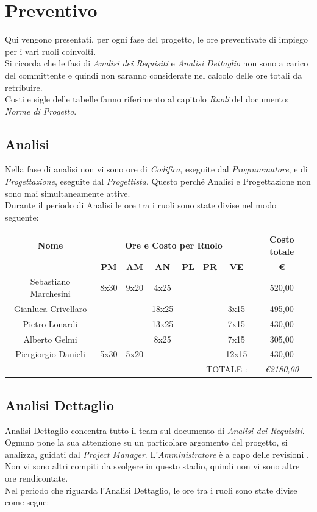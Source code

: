 \documentclass[12pt,a4paper,titlepage]{article}
\begin{document}
\newpage

\section{Preventivo}
Qui vengono presentati, per ogni fase del progetto, le ore preventivate di impiego per i vari ruoli coinvolti.\\
Si ricorda che le fasi di \textit{Analisi dei Requisiti} e \textit{Analisi Dettaglio} non sono a carico del committente e quindi non saranno considerate nel calcolo delle ore totali da retribuire. \\
Costi e sigle delle tabelle fanno riferimento al capitolo \textit{Ruoli} del documento: \textit{Norme di Progetto}.

\subsection{Analisi}
Nella fase di analisi non vi sono ore di \textit{Codifica}, eseguite dal \textit{Programmatore}, e di \textit{Progettazione}, eseguite dal \textit{Progettista}. Questo perché Analisi e Progettazione non sono mai simultaneamente attive. \\
Durante il periodo di Analisi le ore tra i ruoli sono state divise nel modo seguente: \\

{\renewcommand\arraystretch{1.2} %
\begin{tabular}{|c|c|c|c|c|c|c|c|}
	\hline 
	\textbf{Nome} & \multicolumn{6}{c|}{\textbf{Ore e Costo per Ruolo}} & \textbf{Costo totale} \\ 
	& \textbf{PM} & \textbf{AM} & \textbf{AN} & \textbf{PL} & \textbf{PR} & \textbf{VE} & \textbf{ \euro } \\ 
	\hline
	Sebastiano Marchesini & 8x30 & 9x20 & 4x25 & & & & 520,00 \\ 
	\hline 
	Gianluca Crivellaro & & & 18x25 & & & 3x15 & 495,00 \\ 
	\hline 
	Pietro Lonardi & & & 13x25 & & & 7x15 & 430,00 \\ 
	\hline 
	Alberto Gelmi & & & 8x25 & & & 7x15 & 305,00 \\ 
	\hline 
	Piergiorgio Danieli & 5x30 & 5x20 & & & & 12x15 & 430,00 \\ 
	\hline 
	\multicolumn{7}{r|}{TOTALE :} & \textit{\euro 2180,00} \\ 
\end{tabular}} 

\subsection{Analisi Dettaglio}
Analisi Dettaglio concentra tutto il team sul documento di \textit{Analisi dei Requisiti}. Ognuno pone la sua attenzione su un particolare argomento del progetto, si analizza, guidati dal \textit{Project Manager}. L'\textit{Amministratore} è a capo delle revisioni . Non vi sono altri compiti da svolgere in questo stadio, quindi non vi sono altre ore rendicontate.\\
Nel periodo che riguarda l'Analisi Dettaglio, le ore tra i ruoli sono state divise come segue:\\
\end{document}
